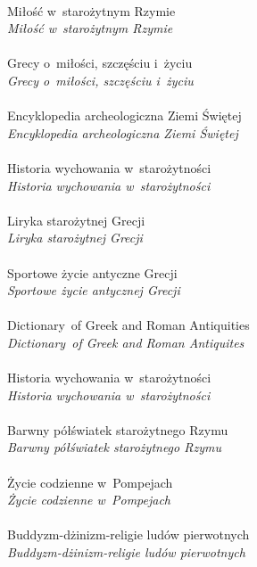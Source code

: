 \documentclass[a4paper,11pt]{article}
\begin{document}
 \\
\Jest  Miłość w~starożytnym Rzymie \\
\Powin \emph{Miłość w~starożytnym Rzymie} \\
 \\
\Jest  Grecy o~miłości, szczęściu i~życiu \\
\Powin \emph{Grecy o~miłości, szczęściu i~życiu} \\
 \\
\Jest  Encyklopedia archeologiczna Ziemi Świętej \\
\Powin \emph{Encyklopedia archeologiczna Ziemi Świętej} \\
 \\
\Jest  Historia wychowania w~starożytności \\
\Powin \emph{Historia wychowania w~starożytności} \\
 \\
\Jest  Liryka starożytnej Grecji \\
\Powin \emph{Liryka starożytnej Grecji} \\
 \\
\Jest  Sportowe życie antyczne Grecji \\
\Powin \emph{Sportowe życie antycznej Grecji} \\
 \\
\Jest  Dictionary~of Greek and Roman Antiquities \\
\Powin \emph{Dictionary~of Greek and Roman Antiquites} \\
 \\
\Jest  Historia wychowania w~starożytności \\
\Powin \emph{Historia wychowania w~starożytności} \\
 \\
\Jest  Barwny półświatek starożytnego Rzymu \\
\Powin \emph{Barwny półświatek starożytnego Rzymu} \\
 \\
\Jest  Życie codzienne w~Pompejach \\
\Powin \emph{Życie codzienne w~Pompejach} \\
 \\
\Jest  Buddyzm-dżinizm-religie ludów pierwotnych \\
\Powin \emph{Buddyzm-dżinizm-religie ludów pierwotnych} \\
 \\
\end{document}
